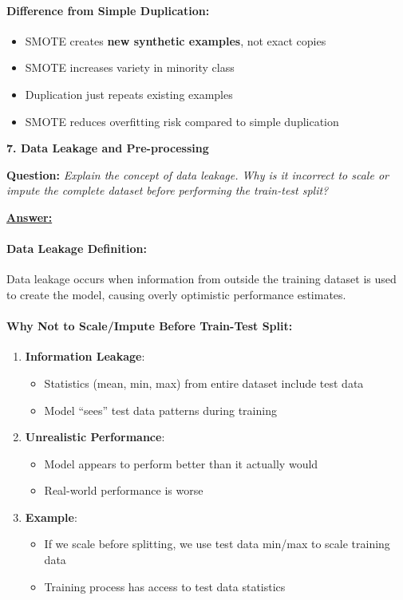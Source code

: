 \documentclass[11pt,a4paper]{article}
\newcommand{\questiontitle}[2]{%
    \vspace{0.4cm}%
    \noindent\textbf{\large\color{headerblue}#1. #2}\par\vspace{0.15cm}%
}
\newcommand{\qprompt}[1]{%
    \noindent\textbf{Question:} \textit{#1}\par\vspace{0.2cm}%
}
\newcommand{\answer}{\noindent\textbf{\underline{Answer:}}\par\vspace{0.15cm}}
\begin{document}
\paragraph{Difference from Simple Duplication:}
\begin{itemize}
    \item SMOTE creates \textbf{new synthetic examples}, not exact copies
    \item SMOTE increases variety in minority class
    \item Duplication just repeats existing examples
    \item SMOTE reduces overfitting risk compared to simple duplication
\end{itemize}

\vspace{0.35cm}

\questiontitle{7}{Data Leakage and Pre-processing}
\qprompt{Explain the concept of data leakage. Why is it incorrect to scale or impute the complete dataset before performing the train-test split?}
\answer
\paragraph{Data Leakage Definition:}
Data leakage occurs when information from outside the training dataset is used to create the model, causing overly optimistic performance estimates.

\paragraph{Why Not to Scale/Impute Before Train-Test Split:}
\begin{enumerate}
    \item \textbf{Information Leakage}: 
    \begin{itemize}
        \item Statistics (mean, min, max) from entire dataset include test data
        \item Model ``sees'' test data patterns during training
    \end{itemize}
    \item \textbf{Unrealistic Performance}:
    \begin{itemize}
        \item Model appears to perform better than it actually would
        \item Real-world performance is worse
    \end{itemize}
    \item \textbf{Example}:
    \begin{itemize}
        \item If we scale before splitting, we use test data min/max to scale training data
        \item Training process has access to test data statistics
    \end{itemize}
\end{enumerate}
\end{document}

